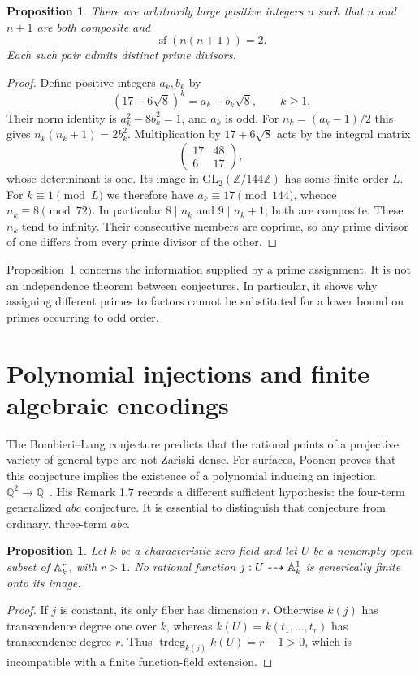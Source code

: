 \documentclass[11pt,a4paper]{article}
\newtheorem{proposition}[theorem]{Proposition}
\theoremstyle{definition}\newtheorem{definition}[theorem]{Definition}
\theoremstyle{remark}\newtheorem{remark}[theorem]{Remark}
\newcommand{\Q}{\mathbb Q}\newcommand{\Z}{\mathbb Z}
\DeclareMathOperator{\sfpart}{sf}
\begin{document}
\begin{proposition}\label{prop:pell}
There are arbitrarily large positive integers $n$ such that
$n$ and $n+1$ are both composite and
\[
                    \sfpart(n(n+1))=2.
\]
Each such pair admits distinct prime divisors.
\end{proposition}
\begin{proof}
Define positive integers $a_k,b_k$ by
\[
 (17+6\sqrt8)^k=a_k+b_k\sqrt8,\qquad k\ge1.
\]
Their norm identity is $a_k^2-8b_k^2=1$, and $a_k$ is odd.
For $n_k=(a_k-1)/2$ this gives
$n_k(n_k+1)=2b_k^2$.
Multiplication by $17+6\sqrt8$ acts by the integral matrix
\[
 \begin{pmatrix}17&48\\6&17\end{pmatrix},
\]
whose determinant is one. Its image in
$\mathrm{GL}_2(\Z/144\Z)$ has some finite order $L$.
For $k\equiv1\pmod L$ we therefore have
$a_k\equiv17\pmod{144}$, whence $n_k\equiv8\pmod{72}$.
In particular $8\mid n_k$ and $9\mid n_k+1$; both are
composite. These $n_k$ tend to infinity. Their consecutive
members are coprime, so any prime divisor of one differs
from every prime divisor of the other.
\end{proof}

Proposition~\ref{prop:pell} concerns the information supplied
by a prime assignment. It is not an independence theorem
between conjectures. In particular, it shows why assigning
different primes to factors cannot be substituted for a
lower bound on primes occurring to odd order.

\section{Polynomial injections and finite algebraic encodings}

The Bombieri--Lang conjecture predicts that the rational points
of a projective variety of general type are not Zariski dense.
For surfaces, Poonen proves that this conjecture implies the
existence of a polynomial inducing an injection
$\Q^2\to\Q$~\cite[Theorem 1.1]{Poonen}.
His Remark 1.7 records a different sufficient hypothesis:
the four-term generalized $abc$ conjecture.
It is essential to distinguish that conjecture from ordinary,
three-term $abc$.

\begin{proposition}\label{prop:dimension}
Let $k$ be a characteristic-zero field and let $U$ be a nonempty
open subset of $\mathbb A^r_k$, with $r>1$.
No rational function $j:U\dashrightarrow\mathbb A^1_k$ is generically
finite onto its image.
\end{proposition}
\begin{proof}
If $j$ is constant, its only fiber has dimension $r$.
Otherwise $k(j)$ has transcendence degree one over $k$, whereas
$k(U)=k(t_1,\ldots,t_r)$ has transcendence degree $r$.
Thus
$\operatorname{trdeg}_{k(j)}k(U)=r-1>0$,
which is incompatible with a finite function-field extension.
\end{proof}
\end{document}
